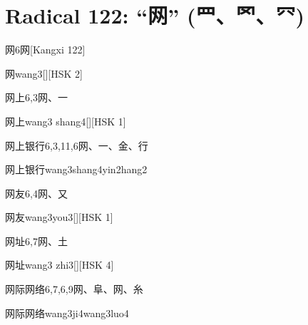 
\section*{Radical 122: ``⽹'' (⺲、罓、⺳)}

\begin{entry}{网}{6}{⽹}[Kangxi 122]
  \begin{phonetics}{网}{wang3}[][HSK 2]
  \end{phonetics}
\end{entry}

\begin{entry}{网上}{6,3}{⽹、⼀}
  \begin{phonetics}{网上}{wang3 shang4}[][HSK 1]
  \end{phonetics}
\end{entry}

\begin{entry}{网上银行}{6,3,11,6}{⽹、⼀、⾦、⾏}
  \begin{phonetics}{网上银行}{wang3shang4yin2hang2}
  \end{phonetics}
\end{entry}

\begin{entry}{网友}{6,4}{⽹、⼜}
  \begin{phonetics}{网友}{wang3you3}[][HSK 1]
  \end{phonetics}
\end{entry}

\begin{entry}{网址}{6,7}{⽹、⼟}
  \begin{phonetics}{网址}{wang3 zhi3}[][HSK 4]
  \end{phonetics}
\end{entry}

\begin{entry}{网际网络}{6,7,6,9}{⽹、⾩、⽹、⽷}
  \begin{phonetics}{网际网络}{wang3ji4wang3luo4}
  \end{phonetics}
\end{entry}

